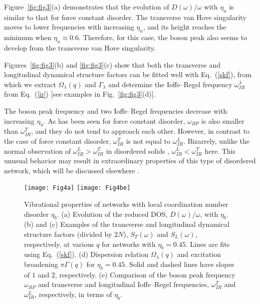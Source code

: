 \documentclass[twocolumn,printnumbers,amsmath,amssymb,prl,verbatim]{revtex4}
\begin{document}
Figure~\ref{fig:fig3}(a) demonstrates that the evolution of $D(\omega)/\omega$ with $\eta_u$ is similar to that for force constant disorder. The transverse van Hove singularity moves to lower frequencies with increasing $\eta_u$, and its height reaches the minimum when $\eta_u\approx 0.6$. Therefore, for this case, the boson peak also seems to develop from the transverse van Hove singularity.

Figures~\ref{fig:fig3}(b) and \ref{fig:fig3}(c) show that both the transverse and longitudinal dynamical structure factors can be fitted well with Eq.~(\ref{skf}), from which we extract $\Omega_{\lambda}(q)$ and $\Gamma_{\lambda}$ and determine the Ioffe--Regel frequency $\omega_{IR}^{\lambda}$ from Eq.~(\ref{ir}) [see examples in Fig.~\ref{fig:fig3}(d)].

The boson peak frequency and two Ioffe--Regel frequencies decrease with increasing $\eta_u$. As has been seen for force constant disorder, $\omega_{BP}$ is also smaller than $\omega_{IR}^T$, and they do not tend to approach each other. However, in contrast to the case of force constant disorder, $\omega_{IR}^T$ is not equal to $\omega_{IR}^L$. Bizarrely, unlike the normal observation of $\omega_{IR}^L>\omega_{IR}^T$ in disordered solids \cite{shintani,xipeng,beltukov}, $\omega_{IR}^L<\omega_{IR}^T$ here. This unusual behavior may result in extraordinary properties of this type of disordered network, which will be discussed elsewhere \cite{junliu}.

\begin{figure}
	\texttt{[image: Fig4a]}
	\texttt{[image: Fig4be]}
\caption{\label{fig:fig4} Vibrational properties of networks with local coordination number disorder $\eta_b$. (a) Evolution of the reduced DOS, $D(\omega)/\omega$, with $\eta_b$. (b) and (c) Examples of the transverse and longitudinal dynamical structure factors (divided by $2N$), $S_{T}(\omega)$ and $S_{L}(\omega)$, respectively, at various $q$ for networks with $\eta_b=0.45$. Lines are fits using Eq.~(\ref{skf}). (d) Dispersion relation $\Omega_{\lambda}(q)$ and excitation broadening $\pi\Gamma(q)$ for $\eta_b=0.45$. Solid and dashed lines have slopes of $1$ and $2$, respectively. (e) Comparison of the boson peak frequency $\omega_{BP}$ and transverse and longitudinal Ioffe--Regel frequencies, $\omega_{IR}^T$ and $\omega_{IR}^L$, respectively, in terms of $\eta_b$.
}
\end{figure}
\end{document}
